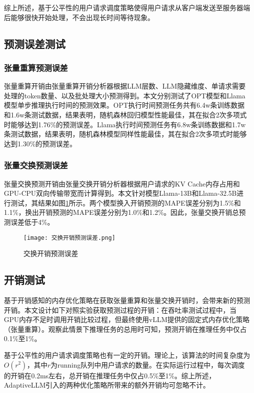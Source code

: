 综上所述，基于公平性的用户请求调度策略使得用户请求从客户端发送至服务器端后能够很快开始处理，不会出现长时间等待现象。

\subsection{预测误差测试}

\subsubsection{张量重算预测误差}

张量重算开销由张量重算开销分析器根据LLM层数、LLM隐藏维度、单请求需要处理的token数量、以及批处理大小预测得到。本文分别测试了OPT模型和Llama模型单步推理执行时间的预测效果。OPT执行时间预测任务共有6.4w条训练数据和1.6w条测试数据，结果表明，随机森林回归模型性能最佳，其在拟合2次多项式时能够达到1.76\%的预测误差。Llama执行时间预测任务有6.8w条训练数据和1.7w条测试数据，结果表明，随机森林模型同样性能最佳，其在拟合2次多项式时能够达到1.30\%的预测误差。


\subsubsection{张量交换预测误差}

张量交换预测开销由张量交换开销分析器根据用户请求的KV Cache内存占用和GPU-CPU双向传输带宽而计算得到。本文针对模型Llama-13B和Llama-32.5B进行测试，其结果如图\ref{Fig:交换开销预测误差}所示。两个模型换入开销预测的MAPE误差分别为1.5\%和1.1\%，换出开销预测的MAPE误差分别为1.0\%和1.2\%。因此，张量交换开销总预测误差低于4\%。

\begin{figure}[!htbp]
  \centering
  \texttt{[image: 交换开销预测误差.png]}
  \caption{交换开销预测误差}
  \label{Fig:交换开销预测误差}
\end{figure}

\subsection{开销测试}

基于开销感知的内存优化策略在获取张量重算和张量交换开销时，会带来新的预测开销。本文设计如下对照实验获取预测过程的开销：在吞吐率测试过程中，当GPU内存不足时调用开销比较过程，但最终使用vLLM提供的固定式内存优化策略（张量重算）。观察此情景下推理任务的总用时可知，预测开销在推理任务中仅占0.1\%至1\%。

{\color{red}基于公平性的用户请求调度策略也有一定的开销。理论上，该算法的时间复杂度为$O(r^2)$，其中$r$为running队列中用户请求的数量。在实际运行过程中，每次调度的开销在0.2ms左右，总开销在推理任务中仅占0.5\%至1\%。综上所述，AdaptiveLLM引入的两种优化策略所带来的额外开销均可忽略不计。}
